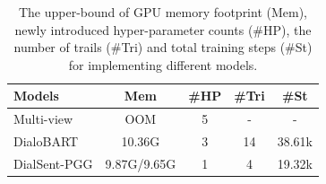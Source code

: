 \begin{table}
	\small
	\centering
	\begin{tabular}{lcccc}
		\toprule[1pt]
		\textbf{Models} & \textbf{Mem} & \textbf{\#HP}& \textbf{\#Tri}&\textbf{\#St} \\
		\midrule[1pt]
		{Multi-view} &OOM &5 &- &-\\
		{DialoBART} &10.36G &3 &14 &38.61k\\
		{DialSent-PGG} &9.87G/9.65G&1 &4 & 19.32k\\
		\bottomrule[1pt]
	\end{tabular}
	\caption{The upper-bound of GPU memory footprint (Mem), newly introduced hyper-parameter counts (\#HP), the number of trails (\#Tri) and total training steps (\#St) for implementing different models.}
	\label{tab:end2endcost}
\end{table}

